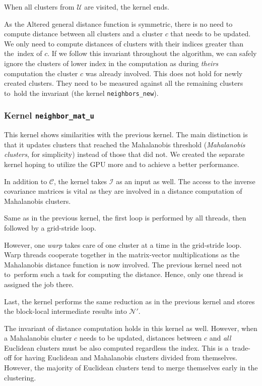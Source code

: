 When all clusters from $\mathcal{U}$ are visited, the kernel ends.

\begin{rem}
	As the Altered general distance function is symmetric, there is no need to compute distance between all clusters and a cluster $c$ that needs to be updated. We only need to compute distances of clusters with their indices greater than the~index of $c$. If we follow this invariant throughout the algorithm, we can safely ignore the clusters of lower index in the computation as during \emph{theirs} computation the cluster $c$ was already involved. This does not hold for newly created clusters. They need to be measured against all the remaining clusters to~hold the invariant (the kernel \texttt{neighbors\_new}).
\end{rem}

\subsubsection{Kernel \texttt{neighbor\_mat\_u}} This kernel shows similarities with the previous kernel. The main distinction is that it updates clusters that reached the Mahalanobis threshold (\emph{Mahalanobis clusters}, for simplicity) instead of those that did not. We created the separate kernel hoping to utilize the GPU more and to achieve a better performance.

In addition to $\mathcal{C}$, the kernel takes $\mathcal{I}$ as an input as well. The access to the inverse covariance matrices is vital as they are involved in a distance computation of Mahalanobis clusters. 

Same as in the previous kernel, the first loop is performed by all threads, then followed by a grid-stride loop. 

However, one \emph{warp} takes care of one cluster at a time in the grid-stride loop. Warp threads cooperate together in the matrix-vector multiplications as the Mahalanobis distance function is now involved. The previous kernel need not to~perform such a task for computing the distance. Hence, only one thread is assigned the job there.

Last, the kernel performs the same reduction as in the previous kernel and stores the block-local intermediate results into $\mathcal{N}'$.

\begin{rem}
	The invariant of distance computation holds in this kernel as well. However, when a Mahalanobis cluster $c$ needs to be updated, distances between $c$ and \emph{all} Euclidean clusters must be also computed regardless the index. This is a~trade-off for having Euclidean and Mahalanobis clusters divided from themselves. However, the majority of Euclidean clusters tend to merge themselves early in the clustering.
\end{rem}


